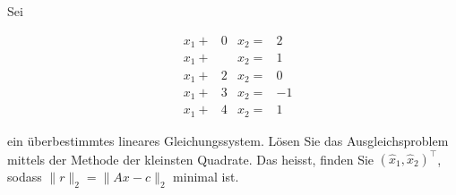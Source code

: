 \vspace{1cm}

\subsubsection{} %

Sei 

\begin{equation*}
    \begin{aligned}
        &x_1 +& 0&x_2 =& 2\\
        &x_1 +&  &x_2 =& 1\\
        &x_1 +& 2&x_2 =& 0\\
        &x_1 +& 3&x_2 =& -1\\
        &x_1 +& 4&x_2 =& 1 
    \end{aligned}
\end{equation*}

ein überbestimmtes lineares Gleichungssystem. Lösen Sie das Ausgleichsproblem mittels der Methode der kleinsten Quadrate. Das heisst, finden Sie \( (\hat{x}_1,\hat{x}_2)^\top \), sodass \( \|r\|_2 = \|Ax-c\|_2 \) minimal ist.

\vspace{1\baselineskip}

